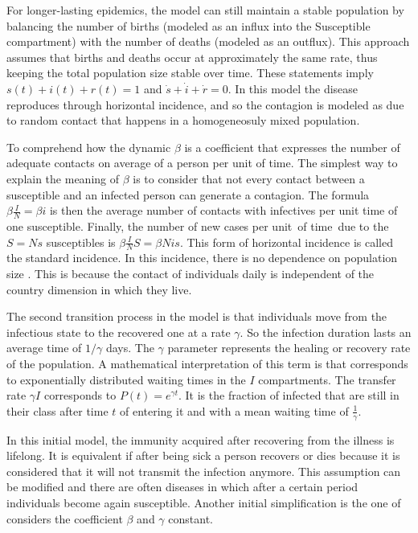 For longer-lasting epidemics, the model can still maintain a stable population by balancing the number of births (modeled as an influx into the Susceptible compartment) with the number of deaths (modeled as an outflux). This approach assumes that births and deaths occur at approximately the same rate, thus keeping the total population size stable over time. These statements imply $s(t) + i(t) + r(t)= 1$ and $\dot{s}+ \dot{i} + \dot{r}= 0$.
In this model the disease reproduces through horizontal incidence, and so the contagion is modeled as due to random contact that happens in a homogeneosuly mixed population.

To comprehend how the dynamic
$\beta$ is a coefficient that expresses the number of adequate contacts on average of a person per unit of time. The simplest way to explain the meaning of $\beta$ is to consider that not every contact between a susceptible and an infected person can generate a contagion. The formula  $\beta \frac{I}{N} = \beta i$ is then the average number of contacts with infectives per unit time of one susceptible. Finally, the number of new cases per unit of time due to the $S = N s$  susceptibles is $\beta \frac{I}{N} S = \beta N i s$. This form of horizontal incidence is called the standard
incidence. In this incidence, there is no dependence on population size \cite{Hethcote_2000}. This is because the contact of individuals daily is independent of the country dimension in which they live. 

The second transition process in the model is that individuals move from the infectious state to the recovered one at a rate $\gamma$. So the infection duration lasts an average time of $1/\gamma$ days. The $\gamma$ parameter represents the healing or recovery rate of the population. A mathematical interpretation of this term is that  
corresponds to exponentially distributed waiting times in the $I$ compartments. The transfer rate $\gamma I$ corresponds to $P(t) = e^{\gamma t}$. It is the fraction of infected that are still in their class after time $t$ of entering it and with a mean waiting time of $\frac{1}{\gamma}$.


In this initial model, the immunity acquired after recovering from the illness is lifelong. It is equivalent if after being sick a person recovers or dies because it is considered that it will not transmit the infection anymore.  This assumption can be modified and there are often diseases in which after a certain period individuals become again susceptible. Another initial simplification is the one of considers the coefficient $\beta$ and $\gamma$ constant. 

